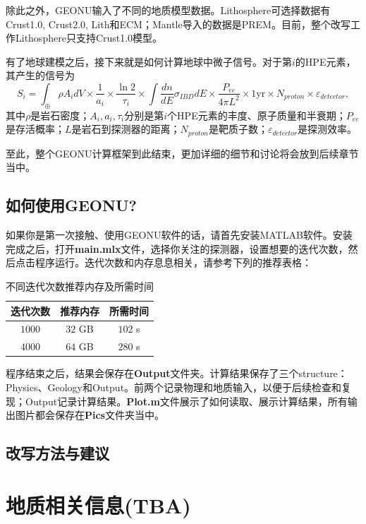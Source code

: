 			除此之外，GEONU输入了不同的地质模型数据。Lithosphere可选择数据有Crust1.0, Crust2.0, Lith和ECM；Mantle导入的数据是PREM。目前，整个改写工作Lithosphere只支持Crust1.0模型。\par
			有了地球建模之后，接下来就是如何计算地球中微子信号。对于第$i$的HPE元素，其产生的信号为
				\begin{equation}
					S_i
					= \int_{\oplus} \rho A_i dV \times \frac{1}{a_i} \times \frac{\ln 2}{\tau_i}\times \int \frac{dn}{dE} \sigma_{IBD} dE \times \frac{P_{ee}}{4\pi L^2} \times 1 \text{yr} \times N_{proton} \times \varepsilon_{detector},
				\end{equation}
			其中$\rho$是岩石密度；$A_i, a_i, \tau_i$分别是第$i$个HPE元素的丰度、原子质量和半衰期；$P_{ee}$是存活概率；$L$是岩石到探测器的距离；$N_{proton}$是靶质子数；$\varepsilon_{detector}$是探测效率。\par
			至此，整个GEONU计算框架到此结束，更加详细的细节和讨论将会放到后续章节当中。
		\section{如何使用GEONU?}
			如果你是第一次接触、使用GEONU软件的话，请首先安装MATLAB软件。安装完成之后，打开\textbf{main.mlx}文件，选择你关注的探测器，设置想要的迭代次数，然后点击程序运行。迭代次数和内存息息相关，请参考下列的推荐表格：
				\begin{table}[H]
					\centering
					\caption{不同迭代次数推荐内存及所需时间}
					\begin{tabular}{|c|c|c|}
						\hline
						迭代次数 & 推荐内存 & 所需时间\\
						\hline
						$1000$ & $32$ GB & $102$ s\\
						\hline
						$4000$ & $64$ GB & $280$ s\\
						\hline
					\end{tabular}
				\end{table}
			程序结束之后，结果会保存在\textbf{Output}文件夹。计算结果保存了三个structure：Physics、Geology和Output。前两个记录物理和地质输入，以便于后续检查和复现；Output记录计算结果。\textbf{Plot.m}文件展示了如何读取、展示计算结果，所有输出图片都会保存在\textbf{Pics}文件夹当中。
		\section{改写方法与建议}
	\chapter{地质相关信息(TBA)}
